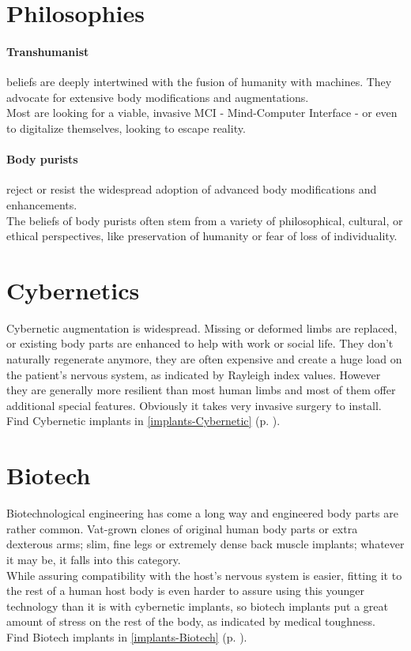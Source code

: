 \section{Philosophies}
\paragraph{Transhumanist}
beliefs are deeply intertwined with the fusion of humanity with machines.
They advocate for extensive body modifications and augmentations.\\
Most are looking for a viable, invasive MCI - Mind-Computer Interface -
	or even to digitalize themselves,
	looking to escape reality.
\paragraph{Body purists} reject or resist the widespread adoption of advanced body modifications and enhancements.\\
The beliefs of body purists often stem from a variety of philosophical, cultural, or ethical perspectives, like preservation of humanity or fear of loss of individuality.

\section{Cybernetics}
Cybernetic augmentation is widespread.
Missing or deformed limbs are replaced,
	or existing body parts are enhanced to help with work or social life.
They don’t naturally regenerate anymore,
	they are often expensive
	and create a huge load on the patient’s nervous system,
	as indicated by Rayleigh index values.
However they are generally more resilient than most human limbs
	and most of them offer additional special features.
Obviously it takes very invasive surgery to install.
\\%
Find Cybernetic implants in \ref{implants-Cybernetic} (p. \pageref{implants-Cybernetic}).

\section{Biotech}
Biotechnological engineering has come a long way and engineered body parts are rather common. Vat-grown clones of original human body parts or extra dexterous arms; slim, fine legs or extremely dense back muscle implants; whatever it may be, it falls into this category.\\
While assuring compatibility with the host's nervous system is easier, fitting it to the rest of a human host body is even harder to assure using this younger technology than it is with cybernetic implants, so biotech implants put a great amount of stress on the rest of the body, as indicated by medical toughness.
\\%
Find Biotech implants in \ref{implants-Biotech} (p. \pageref{implants-Biotech}).
